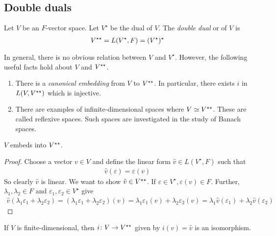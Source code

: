 \subsection{Double duals}
\begin{definition}
	Let $V$ be an $F$-vector space.
	Let $V^\star$ be the dual of $V$.
	The \textit{double dual} or  of $V$ is
	\begin{align*}
		V^{\star\star} = L(V^\star, F) = (V^\star)^\star
	\end{align*}
\end{definition}
\begin{remark}
	In general, there is no obvious relation between $V$ and $V^\star$.
	However, the following useful facts hold about $V$ and $V^{\star\star}$.
	\begin{enumerate}
		\item There is a \textit{canonical embedding} from $V$ to $V^{\star\star}$.
		      In particular, there exists $i$ in $L(V, V^{\star\star})$ which is injective.
		\item There are examples of infinite-dimensional spaces where $V \simeq V^{\star\star}$.
		      These are called reflexive spaces.
		      Such spaces are investigated in the study of Banach spaces.
	\end{enumerate}
\end{remark}
\begin{theorem}
	$V$ embeds into $V^{\star\star}$.
\end{theorem}
\begin{proof}
	Choose a vector $v \in V$ and define the linear form $\hat v \in L(V^\star, F)$ such that
	\begin{align*}
		\hat v(\varepsilon) = \varepsilon(v)
	\end{align*}
	So clearly $\hat v$ is linear.
	We want to show $\hat v \in V^{\star\star}$.
	If $\varepsilon \in V^\star, \varepsilon(v) \in F$.
	Further, $\lambda_1, \lambda_2 \in F$ and $\varepsilon_1, \varepsilon_2 \in V^\star$ give
	\begin{align*}
		\hat v (\lambda_1 \varepsilon_1 + \lambda_2 \varepsilon_2) = (\lambda_1 \varepsilon_1 + \lambda_2 \varepsilon_2)(v) = \lambda_1 \varepsilon_1(v) + \lambda_2 \varepsilon_2(v) = \lambda_1 \hat v(\varepsilon_1) + \lambda_2 \hat v(\varepsilon_2)
	\end{align*}
\end{proof}
\begin{theorem}
	If $V$ is finite-dimensional, then $i \colon V \to V^{\star\star}$ given by $i(v) = \hat v$ is an isomorphism.
\end{theorem}
